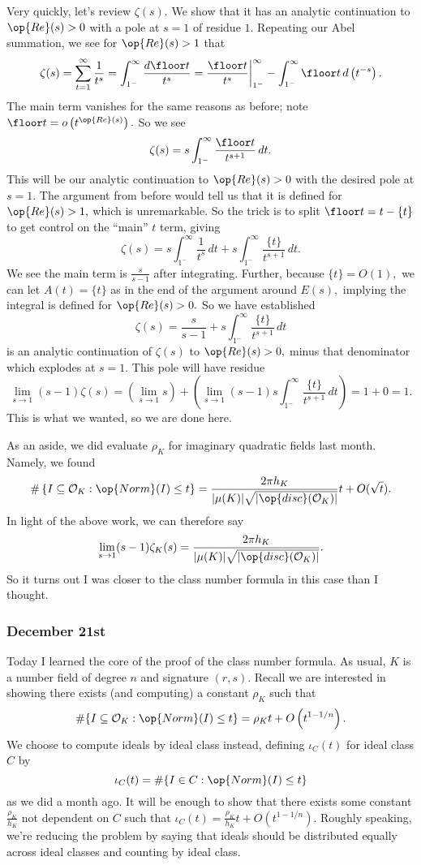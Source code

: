Very quickly, let's review $\zeta(s).$ We show that it has an analytic continuation to $\op{Re}(s)>0$ with a pole at $s=1$ of residue $1.$ Repeating our Abel summation, we see for $\op{Re}(s)>1$ that
\[\zeta(s)=\sum_{t=1}^\infty\frac1{t^s}=\int_{1^-}^\infty\frac{d\floor t}{t^s}=\frac{\floor t}{t^s}\bigg|_{1^-}^\infty-\int_{1^-}^\infty\floor t\,d\left(t^{-s}\right).\]
The main term vanishes for the same reasons as before; note $\floor t=o\left(t^{\op{Re}(s)}\right).$ So we see
\[\zeta(s)=s\int_{1^-}^\infty\frac{\floor t}{t^{s+1}}\,dt.\]
This will be our analytic continuation to $\op{Re}(s)>0$ with the desired pole at $s=1.$ The argument from before would tell us that it is defined for $\op{Re}(s)>1,$ which is unremarkable. So the trick is to split $\floor t=t-\{t\}$ to get control on the ``main'' $t$ term, giving
\[\zeta(s)=s\int_{1^-}^\infty\frac1{t^s}\,dt+s\int_{1^-}^\infty\frac{\{t\}}{t^{s+1}}\,dt.\]
We see the main term is $\frac s{s-1}$ after integrating. Further, because $\{t\}=O(1),$ we can let $A(t)=\{t\}$ as in the end of the argument around $E(s),$ implying the integral is defined for $\op{Re}(s)>0.$ So we have established
\[\zeta(s)=\frac s{s-1}+s\int_{1^-}^\infty\frac{\{t\}}{t^{s+1}}\,dt\]
is an analytic continuation of $\zeta(s)$ to $\op{Re}(s)>0,$ minus that denominator which explodes at $s=1.$ This pole will have residue
\[\lim_{s\to1}(s-1)\zeta(s)=\left(\lim_{s\to1}s\right)+\left(\lim_{s\to1}(s-1)s\int_{1^-}^\infty\frac{\{t\}}{t^{s+1}}\,dt\right)=1+0=1.\]
This is what we wanted, so we are done here.

As an aside, we did evaluate $\rho_K$ for imaginary quadratic fields last month. Namely, we found
\[\#\left\{I\subseteq\mathcal O_K:\op{Norm}(I)\le t\right\}=\frac{2\pi h_K}{|\mu(K)|\sqrt{|\op{disc}(\mathcal O_K)|}}t+O(\sqrt t).\]
In light of the above work, we can therefore say
\[\lim_{s\to1}(s-1)\zeta_K(s)=\frac{2\pi h_K}{|\mu(K)|\sqrt{|\op{disc}(\mathcal O_K)|}}.\]
So it turns out I was closer to the class number formula in this case than I thought.

\subsubsection{December 21st}
Today I learned the core of the proof of the class number formula. As usual, $K$ is a number field of degree $n$ and signature $(r,s).$ Recall we are interested in showing there exists (and computing) a constant $\rho_K$ such that
\[\#\{I\subseteq\mathcal O_K:\op{Norm}(I)\le t\}=\rho_Kt+O\left(t^{1-1/n}\right).\]
We choose to compute ideals by ideal class instead, defining $\iota_C(t)$ for ideal class $C$ by
\[\iota_C(t)=\#\{I\in C:\op{Norm}(I)\le t\}\]
as we did a month ago. It will be enough to show that there exists some constant $\frac{\rho_K}{h_K}$ not dependent on $C$ such that $\iota_C(t)=\frac{\rho_K}{h_K}t+O\left(t^{1-1/n}\right).$ Roughly speaking, we're reducing the problem by saying that ideals should be distributed equally across ideal classes and counting by ideal class.

